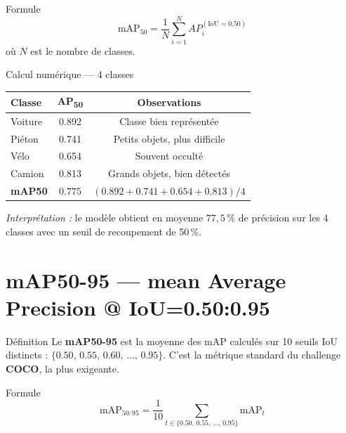 \documentclass[12pt, a4paper]{report}
\newcommand{\mAP}{\text{mAP}}
\newcommand{\IoU}{\text{IoU}}
\begin{document}
\begin{formulebox}{Formule}
  \[
    \mAP_{50} = \frac{1}{N} \sum_{i=1}^{N} AP_i^{(\IoU=0.50)}
  \]
  où $N$ est le nombre de classes.
\end{formulebox}

\begin{examplebox}{Calcul numérique — 4 classes}
  \begin{center}
  \begin{tabular}{lcc}
    \toprule
    \textbf{Classe} & \textbf{AP\textsubscript{50}} & \textbf{Observations} \\
    \midrule
    Voiture    & 0.892 & Classe bien représentée \\
    Piéton     & 0.741 & Petits objets, plus difficile \\
    Vélo       & 0.654 & Souvent occulté \\
    Camion     & 0.813 & Grands objets, bien détectés \\
    \midrule
    \textbf{mAP50} & $\mathbf{0.775}$ & $(0.892+0.741+0.654+0.813)/4$ \\
    \bottomrule
  \end{tabular}
  \end{center}
  \textit{Interprétation :} le modèle obtient en moyenne $77{,}5\,\%$ de précision
  sur les 4 classes avec un seuil de recoupement de 50\,\%.
\end{examplebox}

\section{mAP50-95 — mean Average Precision @ IoU=0.50:0.95}

\begin{definitionbox}{Définition}
  Le \textbf{mAP50-95} est la moyenne des mAP calculés sur 10 seuils IoU
  distincts : $\{0.50,\, 0.55,\, 0.60,\, \ldots,\, 0.95\}$. C'est la métrique
  standard du challenge \textbf{COCO}, la plus exigeante.
\end{definitionbox}

\begin{formulebox}{Formule}
  \[
    \mAP_{50:95} = \frac{1}{10} \sum_{t \in \{0.50,\,0.55,\,\ldots,\,0.95\}}
    \mAP_t
  \]
\end{formulebox}
\end{document}

